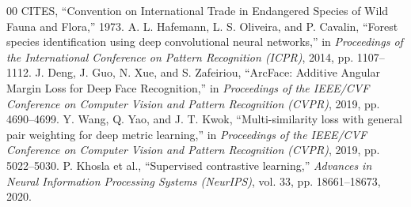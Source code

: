 \documentclass[journal,onecolumn]{IEEEtran}
\begin{document}
\begin{thebibliography}{00}
 CITES, ``Convention on International Trade in Endangered Species of Wild Fauna and Flora,'' 1973.
 A. L. Hafemann, L. S. Oliveira, and P. Cavalin, ``Forest species identification using deep convolutional neural networks,'' in \textit{Proceedings of the International Conference on Pattern Recognition (ICPR)}, 2014, pp. 1107--1112.
 J. Deng, J. Guo, N. Xue, and S. Zafeiriou, ``ArcFace: Additive Angular Margin Loss for Deep Face Recognition,'' in \textit{Proceedings of the IEEE/CVF Conference on Computer Vision and Pattern Recognition (CVPR)}, 2019, pp. 4690--4699.
 Y. Wang, Q. Yao, and J. T. Kwok, ``Multi-similarity loss with general pair weighting for deep metric learning,'' in \textit{Proceedings of the IEEE/CVF Conference on Computer Vision and Pattern Recognition (CVPR)}, 2019, pp. 5022--5030.
 P. Khosla et al., ``Supervised contrastive learning,'' \textit{Advances in Neural Information Processing Systems (NeurIPS)}, vol. 33, pp. 18661--18673, 2020.
\end{thebibliography}
\end{document}
